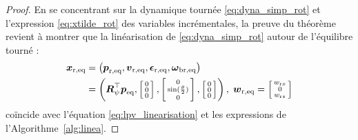 \begin{proof}
En se concentrant sur la dynamique tournée \eqref{eq:dyna_simp_rot} et l'expression \eqref{eq:xtilde_rot} des variables incrémentales, la preuve du théorème revient à montrer que la linéarisation de \eqref{eq:dyna_simp_rot} autour de l'équilibre tourné : 
\begin{align}
\label{eq:rotated_eq}
\boldsymbol{x}_{\text{r,eq}} &= \left( \boldsymbol{p}_{\text{r,eq}}, \boldsymbol{v}_{\text{r,eq}},
\boldsymbol{\epsilon}_{\text{r,eq}},
\boldsymbol{\omega}_{\text{br,eq}} \right) \\
\nonumber
&= \left(\boldsymbol{R}^\top_{\psi} \boldsymbol{p}_{\text{eq}},  
\left[ \begin{smallmatrix}0 \\ 0 \\ 0 \end{smallmatrix} \right],   \left[ \begin{smallmatrix}0 \\ \sin(\frac{\theta}{2}) \\ 0 \end{smallmatrix} \right], 
\left[ \begin{smallmatrix}0 \\ 0 \\ 0 \end{smallmatrix} \right] \right),\;
\boldsymbol{w}_{\mathrm{r,eq}}  = \left[ \begin{smallmatrix}w_{\text{r}x} \\ 0 \\w_{\text{r}z} \end{smallmatrix} \right]
\end{align}
coïncide avec l'équation \eqref{eq:lpv_linearisation} et les expressions de l'Algorithme~\ref{alg:linea}.


\end{proof}
